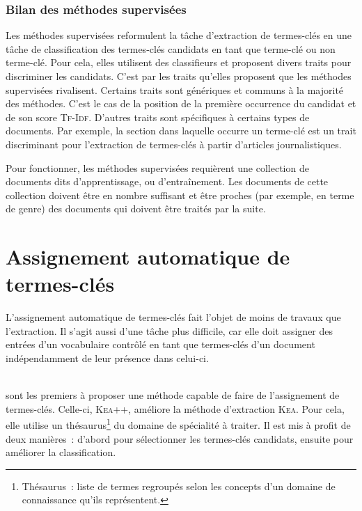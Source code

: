       \subsubsection{Bilan des méthodes supervisées}
      \label{subsubsec:main-state_of_the_art-automatic_keyphrase_extraction-supervised_keyphrase_extraction-conclusion}
        Les méthodes supervisées reformulent la tâche d'extraction de
        termes-clés en une tâche de classification des termes-clés candidats en
        tant que \og{}terme-clé\fg{} ou \og{}non terme-clé\fg{}. Pour cela,
        elles utilisent des classifieurs et proposent divers traits pour
        discriminer les candidats. C'est par les traits qu'elles proposent que
        les méthodes supervisées rivalisent. Certains traits sont génériques et
        communs à la majorité des méthodes. C'est le cas de la position de la
        première occurrence du candidat et de son score \textsc{Tf-Idf}.
        D'autres traits sont spécifiques à certains types de documents. Par
        exemple, la section dans laquelle occurre un terme-clé est un trait
        discriminant pour l'extraction de termes-clés à partir d'articles
        journalistiques.

        Pour fonctionner, les méthodes supervisées requièrent une collection de
        documents dits \og{}d'apprentissage\fg{}, ou \og{}d'entraînement\fg{}.
        Les documents de cette collection doivent être en nombre suffisant et
        être proches (par exemple, en terme de genre) des documents qui doivent
        être traités par la suite.

  \section{Assignement automatique de termes-clés}
  \label{sec:main-state_of_the_art-automatic_keyphrase_assignment}
    L'assignement automatique de termes-clés fait l'objet de moins de travaux
    que l'extraction. Il s'agit aussi d'une tâche plus difficile, car elle doit
    assigner des entrées d'un vocabulaire contrôlé en tant que termes-clés d'un
    document indépendamment de leur présence dans celui-ci.

    ~\\ sont les premiers à proposer une
    méthode capable de faire de l'assignement de termes-clés. Celle-ci,
    \textsc{Kea}++, améliore la méthode d'extraction \textsc{Kea}. Pour cela,
    elle utilise un thésaurus\footnote{Thésaurus~: liste de termes regroupés
    selon les concepts d'un domaine de connaissance qu'ils représentent.} du
    domaine de spécialité à traiter. Il est mis à profit de deux manières~:
    d'abord pour sélectionner les termes-clés candidats, ensuite pour améliorer
    la classification.


